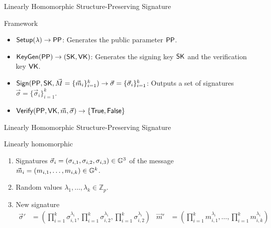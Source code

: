 \begin{frame}{Linearly Homomorphic Structure-Preserving Signature}
  \begin{block}{Framework}
  \begin{itemize}
  \item $\boldmath{{\mathsf{Setup}}(\lambda) \to \mathsf{PP}}$: Generates the public parameter $\mathsf{PP}$.
  \item $\boldmath{{\mathsf{KeyGen}}(\mathsf{PP}) \to (\mathsf{SK}, \mathsf{VK})}$: Generates the signing key $\mathsf{SK}$ and the verification key $\mathsf{VK}$.
  \item $\boldmath{{\mathsf{Sign}}(\mathsf{PP}, \mathsf{SK}, \vec{M} = \{\vec{m}_i\}_{i=1}^k) \to \vec{\sigma} = \{\vec{\sigma}_i\}_{i=1}^k}$: Outputs a set of signatures $\vec{\sigma} = \{\vec{\sigma}_i\}_{i=1}^k$.
  \item $\boldmath{{\mathsf{Verify}}(\mathsf{PP}, \mathsf{VK}, \vec{m}, \vec{\sigma}) \to \{\mathsf{True}, \mathsf{False}\}}$
  \end{itemize}
  \end{block}
\end{frame}

\begin{frame}{Linearly Homomorphic Structure-Preserving Signature}
  \begin{block}{Linearly homomorphic}
    \begin{enumerate}
    \item Signatures $\vec{\sigma}_i = (\sigma_{i,1}, \sigma_{i,2}, \sigma_{i,3}) \in \mathbb{G}^3$ of the message $\vec{m}_i = (m_{i,1}, \dots, m_{i,k}) \in \mathbb{G}^k$.
    \item Random values $\lambda_1, \dots, \lambda_k \in \mathbb{Z}_p$.
    \item New signature
      \begin{align*}
        \vec{\sigma}' &= (\prod_{i = 1}^k \sigma_{i,1}^{\lambda_i}, \prod_{i = 1}^k \sigma_{i,2}^{\lambda_i}, \prod_{i = 1}^k \sigma_{i,2}^{\lambda_i}) & \vec{m}' &= (\prod_{i = 1}^km_{i,1}^{\lambda_i}, \dots, \prod_{i = 1}^km_{i,k}^{\lambda_i})
      \end{align*}
    \end{enumerate}
  \end{block}
  
\end{frame}
